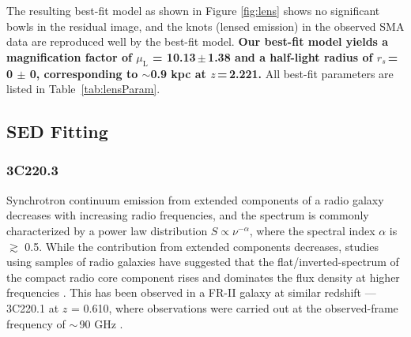 \documentclass[iop, revtex4]{emulateapj}
\begin{document}
The resulting best-fit model as shown in Figure\,\,\ref{fig:lens} shows no significant bowls in the residual
image, and the knots (lensed emission) in the observed SMA data are reproduced well by the best-fit model.
{\bf  Our best-fit model yields a magnification
factor of $\mu_\textrm{L}$ = 10.13\,$\pm$\,1.38
and a half-light radius of $r_{s}$\,=\,0 $\pm$ 0, corresponding to $\sim$0.9 kpc at $z$\,=\,2.221.} 
All best-fit
parameters are listed in Table~\ref{tab:lensParam}. 


\subsection{SED Fitting} \label{sec:SED}
\subsubsection{3C220.3}\label{sec:SEDFg}
Synchrotron continuum emission from extended components of a radio galaxy decreases with increasing radio frequencies,
and the spectrum is commonly characterized by a power law distribution $S \propto \nu^{-\alpha}$, where the
spectral index $\alpha$ is $\gtrsim$ 0.5. While the contribution from extended components decreases, studies using
samples of radio galaxies have suggested that the flat/inverted-spectrum of the compact radio core component rises
and dominates the flux density at higher frequencies \citep{Kellermann81a,Begelman84a}. This has been observed in a FR-II galaxy at similar redshift --- 3C220.1 at $z$ = 0.610, where observations were carried out at the observed-frame frequency of $\sim$\,90 GHz \citep{Hardcastle08a}.
\end{document}
